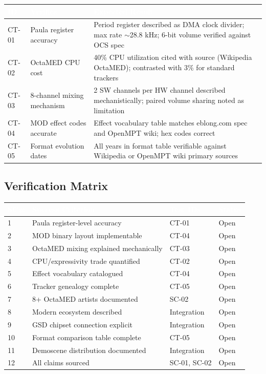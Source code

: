 \documentclass[11pt,letterpaper]{article}
\newcommand{\tableheader}[1]{\textbf{\sffamily\textcolor{white}{#1}}}
\begin{document}
\begin{center}
\begin{tabularx}{\textwidth}{C{1.2cm}L{4cm}X}
\toprule
{}
\tableheader{ID} & \tableheader{Verifies} & \tableheader{Expected Result} \\
\midrule
CT-01 & Paula register accuracy & Period register described as DMA clock divider; max rate $\sim$28.8 kHz; 6-bit volume verified against OCS spec \\
CT-02 & OctaMED CPU cost & 40\% CPU utilization cited with source (Wikipedia OctaMED); contrasted with 3\% for standard trackers \\
CT-03 & 8-channel mixing mechanism & 2 SW channels per HW channel described mechanistically; paired volume sharing noted as limitation \\
CT-04 & MOD effect codes accurate & Effect vocabulary table matches eblong.com spec and OpenMPT wiki; hex codes correct \\
CT-05 & Format evolution dates & All years in format table verifiable against Wikipedia or OpenMPT wiki primary sources \\
\bottomrule
\end{tabularx}
\end{center}

\subsection{Verification Matrix}

\begin{center}
\begin{tabularx}{\textwidth}{C{1cm}X L{3cm}C{2cm}}
\toprule
{}
\tableheader{SC\#} & \tableheader{Success Criterion} & \tableheader{Test IDs} & \tableheader{Status} \\
 & Paula register-level accuracy & CT-01 & Open \\
2 & MOD binary layout implementable & CT-04 & Open \\
3 & OctaMED mixing explained mechanically & CT-03 & Open \\
4 & CPU/expressivity trade quantified & CT-02 & Open \\
5 & Effect vocabulary catalogued & CT-04 & Open \\
6 & Tracker genealogy complete & CT-05 & Open \\
7 & 8+ OctaMED artists documented & SC-02 & Open \\
8 & Modern ecosystem described & Integration & Open \\
9 & GSD chipset connection explicit & Integration & Open \\
10 & Format comparison table complete & CT-05 & Open \\
11 & Demoscene distribution documented & Integration & Open \\
12 & All claims sourced & SC-01, SC-02 & Open \\
\bottomrule
\end{tabularx}
\end{center}
\end{document}
